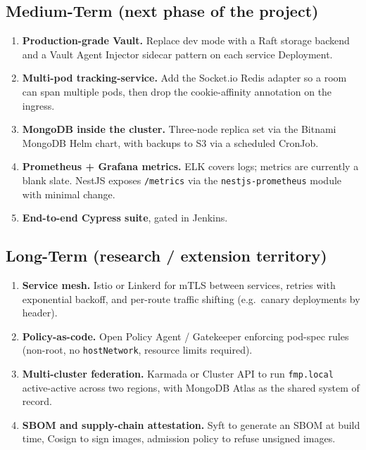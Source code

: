 \documentclass[11pt,a4paper]{article}
\begin{document}
\subsection{Medium-Term (next phase of the project)}
\begin{enumerate}[leftmargin=*]
  \item \textbf{Production-grade Vault.}  Replace dev mode with a
        Raft storage backend and a Vault Agent Injector sidecar
        pattern on each service Deployment.
  \item \textbf{Multi-pod tracking-service.}  Add the Socket.io
        Redis adapter so a room can span multiple pods, then drop
        the cookie-affinity annotation on the ingress.
  \item \textbf{MongoDB inside the cluster.}  Three-node replica
        set via the Bitnami MongoDB Helm chart, with backups to
        S3 via a scheduled CronJob.
  \item \textbf{Prometheus + Grafana metrics.}  ELK covers logs;
        metrics are currently a blank slate.  NestJS exposes
        \texttt{/metrics} via the \texttt{nestjs-prometheus}
        module with minimal change.
  \item \textbf{End-to-end Cypress suite}, gated in Jenkins.
\end{enumerate}

\subsection{Long-Term (research / extension territory)}
\begin{enumerate}[leftmargin=*]
  \item \textbf{Service mesh.}  Istio or Linkerd for mTLS between
        services, retries with exponential backoff, and per-route
        traffic shifting (e.g.\ canary deployments by header).
  \item \textbf{Policy-as-code.}  Open Policy Agent / Gatekeeper
        enforcing pod-spec rules (non-root, no
        \texttt{hostNetwork}, resource limits required).
  \item \textbf{Multi-cluster federation.}  Karmada or Cluster
        API to run \texttt{fmp.local} active-active across two
        regions, with MongoDB Atlas as the shared system of
        record.
  \item \textbf{SBOM and supply-chain attestation.}  Syft to
        generate an SBOM at build time, Cosign to sign images,
        admission policy to refuse unsigned images.
\end{enumerate}
\end{document}
